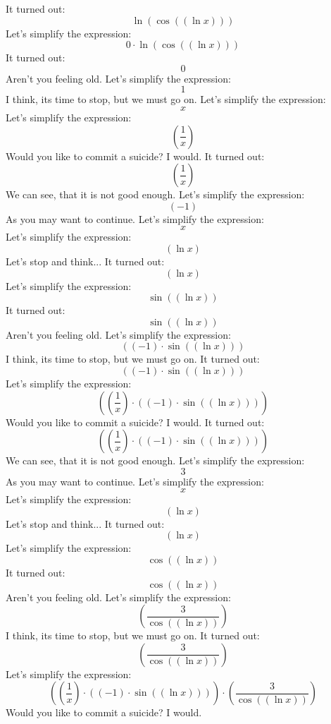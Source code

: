 \documentclass[12pt,a4paper]{scrartcl}
\begin{document}
It turned out: $$ \ln  \left(  \cos  \left(  \left(  \ln x \right)  \right)  \right) $$  
Let's simplify the expression: $$0 \cdot  \ln  \left(  \cos  \left(  \left(  \ln x \right)  \right)  \right) $$  
It turned out: $$0$$ Aren't you feeling old. 
Let's simplify the expression: $$1$$ I think, its time to stop, but we must go on. 
Let's simplify the expression: $$x$$  
Let's simplify the expression: $$ \left(  \frac{1}{x} \right) $$ Would you like to commit a suicide? I would. 
It turned out: $$ \left(  \frac{1}{x} \right) $$ We can see, that it is not good enough. 
Let's simplify the expression: $$ \left( -1 \right) $$ As you may want to continue. 
Let's simplify the expression: $$x$$  
Let's simplify the expression: $$ \left(  \ln x \right) $$ Let's stop and think... 
It turned out: $$ \left(  \ln x \right) $$  
Let's simplify the expression: $$ \sin  \left(  \left(  \ln x \right)  \right) $$  
It turned out: $$ \sin  \left(  \left(  \ln x \right)  \right) $$ Aren't you feeling old. 
Let's simplify the expression: $$ \left(  \left( -1 \right)  \cdot  \sin  \left(  \left(  \ln x \right)  \right)  \right) $$ I think, its time to stop, but we must go on. 
It turned out: $$ \left(  \left( -1 \right)  \cdot  \sin  \left(  \left(  \ln x \right)  \right)  \right) $$  
Let's simplify the expression: $$ \left(  \left(  \frac{1}{x} \right)  \cdot  \left(  \left( -1 \right)  \cdot  \sin  \left(  \left(  \ln x \right)  \right)  \right)  \right) $$ Would you like to commit a suicide? I would. 
It turned out: $$ \left(  \left(  \frac{1}{x} \right)  \cdot  \left(  \left( -1 \right)  \cdot  \sin  \left(  \left(  \ln x \right)  \right)  \right)  \right) $$ We can see, that it is not good enough. 
Let's simplify the expression: $$3$$ As you may want to continue. 
Let's simplify the expression: $$x$$  
Let's simplify the expression: $$ \left(  \ln x \right) $$ Let's stop and think... 
It turned out: $$ \left(  \ln x \right) $$  
Let's simplify the expression: $$ \cos  \left(  \left(  \ln x \right)  \right) $$  
It turned out: $$ \cos  \left(  \left(  \ln x \right)  \right) $$ Aren't you feeling old. 
Let's simplify the expression: $$ \left(  \frac{3}{ \cos  \left(  \left(  \ln x \right)  \right) } \right) $$ I think, its time to stop, but we must go on. 
It turned out: $$ \left(  \frac{3}{ \cos  \left(  \left(  \ln x \right)  \right) } \right) $$  
Let's simplify the expression: $$ \left(  \left(  \frac{1}{x} \right)  \cdot  \left(  \left( -1 \right)  \cdot  \sin  \left(  \left(  \ln x \right)  \right)  \right)  \right)  \cdot  \left(  \frac{3}{ \cos  \left(  \left(  \ln x \right)  \right) } \right) $$ Would you like to commit a suicide? I would. 
\end{document}
